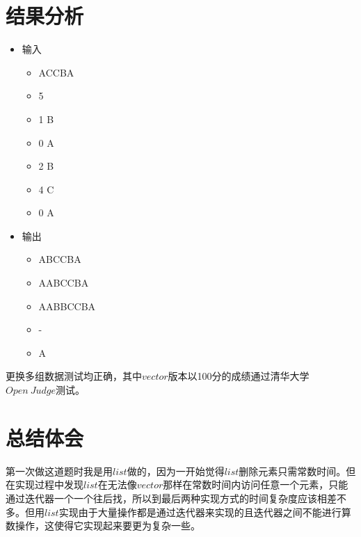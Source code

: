 \documentclass[UTF8]{ctexart}
\begin{document}
	\section{结果分析}
	\begin{itemize}
	\item 输入
		\begin{itemize}
			\item[ ]ACCBA
			\item[ ]5
			\item[ ]1 B
			\item[ ]0 A
			\item[ ]2 B
			\item[ ]4 C
			\item[ ]0 A
		\end{itemize}
	\item 输出
		\begin{itemize}
			\item[ ]ABCCBA
			\item[ ]AABCCBA
			\item[ ]AABBCCBA
			\item[ ]-
			\item[ ]A	
		\end{itemize}
	\end{itemize}
	
	\indent 更换多组数据测试均正确，其中$vector$版本以100分的成绩通过清华大学$Open\ Judge$测试。
	
	\section{总结体会}
	\indent 第一次做这道题时我是用$list$做的，因为一开始觉得$list$删除元素只需常数时间。但在实现过程中发现$list$在无法像$vector$那样在常数时间内访问任意一个元素，只能通过迭代器一个一个往后找，所以到最后两种实现方式的时间复杂度应该相差不多。但用$list$实现由于大量操作都是通过迭代器来实现的且迭代器之间不能进行算数操作，这使得它实现起来要更为复杂一些。


\end{document}
